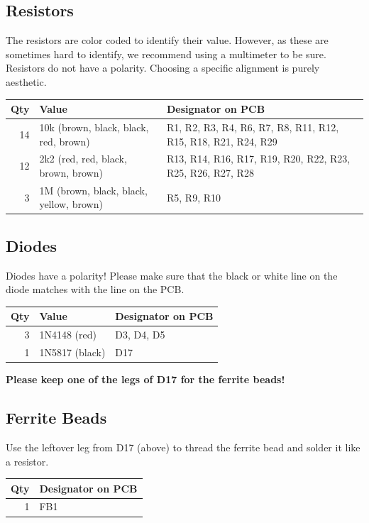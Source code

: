 \documentclass[a4paper,
               11pt,
               parskip=half,
               headinclude,
               titlepage=false]{scrartcl}
\begin{document}
\subsection*{Resistors}

The resistors are color coded to identify their value. However, as these are sometimes hard to identify, we recommend using a multimeter to be sure.
Resistors do not have a polarity. Choosing a specific alignment is purely aesthetic.

\begin{tabularx}{\textwidth}{| r | l | X |}
\hline 
Qty & Value & Designator on PCB \\
\hline
14 & 
10k (brown, black, black, red, brown) & 
R1, R2, R3, R4, R6, R7, R8, R11, R12, R15, R18, R21, R24, R29 \\
\hline
12 &
2k2 (red, red, black, brown, brown) &
R13, R14, R16, R17, R19, R20, R22, R23, R25, R26, R27, R28 \\
\hline
3 &
1M (brown, black, black, yellow, brown) &
R5, R9, R10 \\
\hline  
\end{tabularx}


\subsection*{Diodes}

Diodes have a polarity! Please make sure that the black or white line on the diode matches with the line on the PCB.


\begin{tabularx}{\textwidth}{| r | l | X |}
\hline
Qty & Value & Designator on PCB \\
\hline
3 &
1N4148 (red) &
D3, D4, D5 \\
\hline
1 &
1N5817 (black) &
D17 \\
\hline
\end{tabularx}

\textbf{Please keep one of the legs of D17 for the ferrite beads!}


\subsection*{Ferrite Beads}

Use the leftover leg from D17 (above) to thread the ferrite bead and solder it like a resistor.

\begin{tabularx}{\textwidth}{| r |  X |}
\hline
Qty & Designator on PCB \\
\hline
1 &
FB1 \\
\hline
\end{tabularx}
\end{document}
